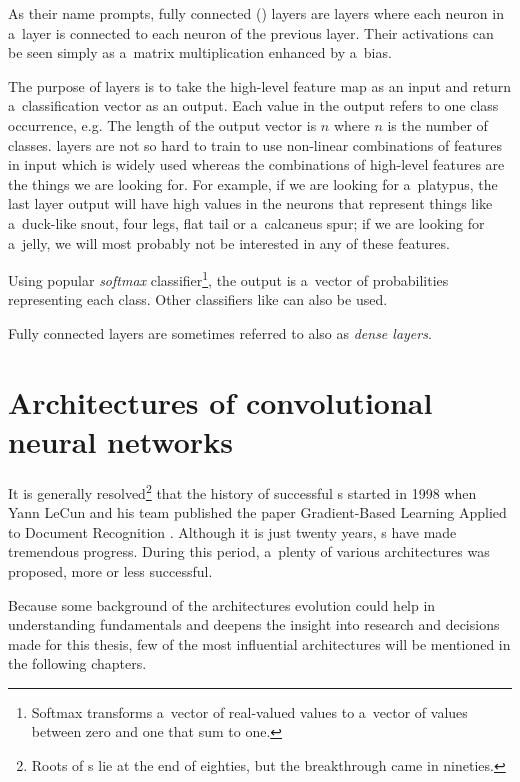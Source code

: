 As their name prompts, fully connected () layers are layers where each 
neuron in a~layer is connected to each neuron of the previous layer. Their 
activations can be seen simply as a~matrix multiplication enhanced by a~bias.  

The purpose of  layers is to take the high-level feature map as an input
and return a~classification vector as an output. Each value in the output
refers to one class occurrence, e.g. The length of the output vector is $n$
where $n$ is the number of classes.  layers are not so hard to train to
use non-linear combinations of features in input which is widely used whereas
the combinations of high-level features are the things we are looking for. For 
example, if we are looking for a~platypus, the last layer output will have high
values in the neurons that represent things like a~duck-like snout, four legs, 
flat tail or a~calcaneus spur; if we are looking for a~jelly, we will most 
probably not be interested in any of these features. 

Using popular \textit{softmax} classifier\footnote{Softmax transforms a~vector 
of real-valued values to a~vector of values between zero and one that sum to 
one.}, the output is a~vector of probabilities representing each class. Other 
classifiers like  can also be used. 

Fully connected layers are sometimes referred to also as \textit{dense layers}.

\section{Architectures of convolutional neural networks}
\label{cnn-architectures}

It is generally resolved\footnote{Roots of s lie at the end of
eighties, but the breakthrough came in nineties.} that the history of
successful s started in 1998 when Yann LeCun and his team published the
paper Gradient-Based Learning Applied to Document Recognition \cite{lenet5}.
Although it is just twenty years, s have made tremendous progress.
During this period, a~plenty of various architectures was proposed, more or
less successful.

Because some background of the  architectures evolution could help in 
understanding  fundamentals and deepens the insight into research and 
decisions made for this thesis, few of the most influential architectures will
be mentioned in the following chapters.

